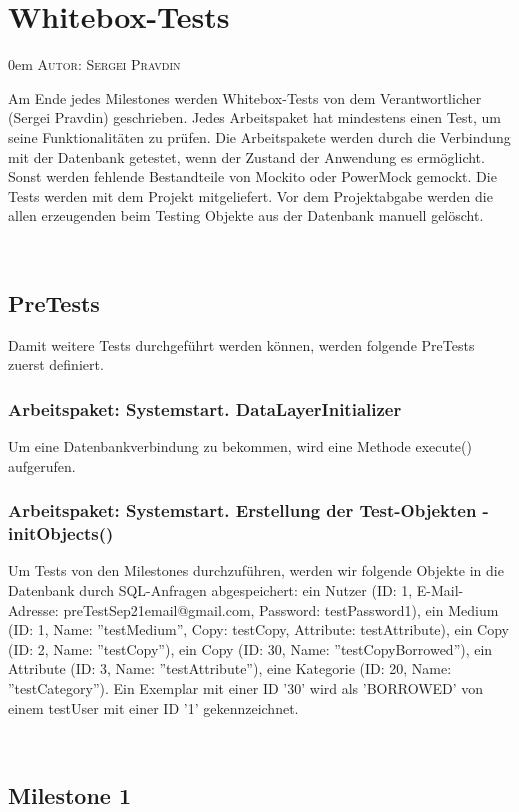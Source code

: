 \documentclass{article}
\makeatletter
\newcommand{\sectionauthor}[1]{
	{\parindent 0em \large \scshape Autor: #1 \par \nobreak \vspace*{1em}}
	\@afterheading
}
\makeatother
\begin{document}

\section{Whitebox-Tests}
\sectionauthor{Sergei Pravdin}
Am Ende jedes Milestones werden Whitebox-Tests von dem Verantwortlicher (Sergei Pravdin) geschrieben. Jedes Arbeitspaket hat mindestens einen Test, um seine Funktionalitäten zu prüfen. Die Arbeitspakete werden durch die Verbindung mit der Datenbank getestet, wenn der Zustand der Anwendung es ermöglicht. Sonst werden fehlende Bestandteile von Mockito oder PowerMock gemockt. Die Tests werden mit dem Projekt mitgeliefert. Vor dem Projektabgabe werden die allen erzeugenden beim Testing Objekte aus der Datenbank manuell gelöscht. 

­\subsection{PreTests}
Damit weitere Tests durchgeführt werden können, werden folgende PreTests zuerst definiert.

\subsubsection{Arbeitspaket: Systemstart. DataLayerInitializer}
Um eine Datenbankverbindung zu bekommen, wird eine Methode execute() aufgerufen.

\subsubsection{Arbeitspaket: Systemstart. Erstellung der Test-Objekten - initObjects()}
Um Tests von den Milestones durchzuführen, werden wir folgende Objekte in die Datenbank durch SQL-Anfragen abgespeichert: ein Nutzer (ID: 1, E-Mail-Adresse:  preTestSep21email@gmail.com, Password: testPassword1), ein Medium (ID: 1, Name: ''testMedium'', Copy: testCopy, Attribute: testAttribute), ein Copy (ID: 2, Name: ''testCopy''), ein Copy (ID: 30, Name: ''testCopyBorrowed''), ein Attribute (ID: 3, Name: ''testAttribute''), eine Kategorie (ID: 20, Name: ''testCategory''). \linebreak
Ein Exemplar mit einer ID '30' wird als 'BORROWED' von einem testUser mit einer ID '1' gekennzeichnet.

­\subsection{Milestone 1}
\end{document}
